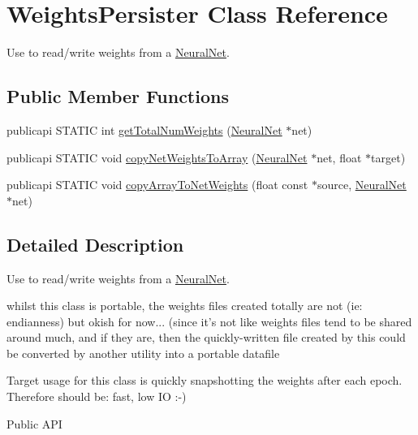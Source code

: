 \hypertarget{classWeightsPersister}{\section{Weights\-Persister Class Reference}
\label{classWeightsPersister}
}


Use to read/write weights from a \hyperlink{classNeuralNet}{Neural\-Net}.  


\subsection*{Public Member Functions}
\begin{DoxyCompactItemize}
\item 
publicapi S\-T\-A\-T\-I\-C int \hyperlink{classWeightsPersister_a5ec7638ead9249b696f60e39e47accd9}{get\-Total\-Num\-Weights} (\hyperlink{classNeuralNet}{Neural\-Net} $\ast$net)
\item 
publicapi S\-T\-A\-T\-I\-C void \hyperlink{classWeightsPersister_a73c796f8e7e64c040aa5fe3c9e4f32ef}{copy\-Net\-Weights\-To\-Array} (\hyperlink{classNeuralNet}{Neural\-Net} $\ast$net, float $\ast$target)
\item 
publicapi S\-T\-A\-T\-I\-C void \hyperlink{classWeightsPersister_a454a65b2a8ad6c04f8b95533c3f9416c}{copy\-Array\-To\-Net\-Weights} (float const $\ast$source, \hyperlink{classNeuralNet}{Neural\-Net} $\ast$net)
\end{DoxyCompactItemize}


\subsection{Detailed Description}
Use to read/write weights from a \hyperlink{classNeuralNet}{Neural\-Net}. 

whilst this class is portable, the weights files created totally are not (ie\-: endianness) but okish for now... (since it's not like weights files tend to be shared around much, and if they are, then the quickly-\/written file created by this could be converted by another utility into a portable datafile

Target usage for this class is quickly snapshotting the weights after each epoch. Therefore should be\-: fast, low I\-O \-:-\/)\begin{DoxyParagraph}{Public A\-P\-I}

\end{DoxyParagraph}



